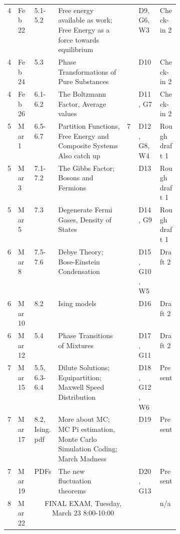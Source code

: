 \documentclass[12pt]{article}
\begin{document}
{\begin{table}[]
\begin{tabular}{p{.03\linewidth}|p{.065\linewidth}|p{.065\linewidth}|p{0.4\linewidth}|p{.08\linewidth}|p{.085\linewidth}|p{.1\linewidth}}
4    & Feb 22 & 5.1-5.2        & Free energy available as work; Free Energy as a force towards equilibrium               &                                           & D9, G6, W3   & Check-in 2    \\
4    & Feb 24 & 5.3            & Phase Transformations of Pure Substances             &                                           & D10          & Check-in 2    \\
4    & Feb 26 & 6.1-6.2        & The Boltzmann Factor, Average values      &                                                                                     & D11, G7      & Check-in 2    \\ \hline
5    & Mar 1  &6.5-6.7        & Partition Functions, Free Energy and Composite Systems Also catch up       & 7                                       & D12, G8, W4  & Rough draft 1 \\
5    & Mar 3  & 7.1-7.2        & The Gibbs Factor; Bosons and Fermions                           &                                           & D13          & Rough draft 1 \\
5    & Mar 5  & 7.3            & Degenerate Fermi Gases, Density of States                                                      &                                           & D14, G9      & Rough draft 1 \\ \hline
6    & Mar 8  & 7.5-7.6        & Debye Theory; Bose-Einstein Condensation                       &                                           & D15, G10, W5 & Draft 2 \\
6    & Mar 10 & 8.2            & Ising models               &                                           & D16          & Draft 2 \\ \hline \hline
6    & Mar 12 &5.4            & Phase Transitions of Mixtures                                                    &                                           & D17, G11     & Draft 2 \\ \hline
7    & Mar 15 &5.5, 6.3-6.4   & Dilute Solutions; Equipartition; Maxwell Speed Distribution                                          &                                           & D18, G12, W6 & Present \\
7    & Mar 17 &8.2, Ising.pdf & More about MC; MC Pi estimation, Monte Carlo Simulation Coding; March Madness                                          &                                           & D19          & Present \\
7    & Mar 19 & PDFs           & The new fluctuation theorems                         &                                           & D20, G13     & Present \\ \hline
8    & Mar 22 & \multicolumn{3}{c}{FINAL EXAM, Tuesday, March 23 8:00-10:00}                                                                                                    & &n/a          
\end{tabular}
\end{table}
}
\end{document}
